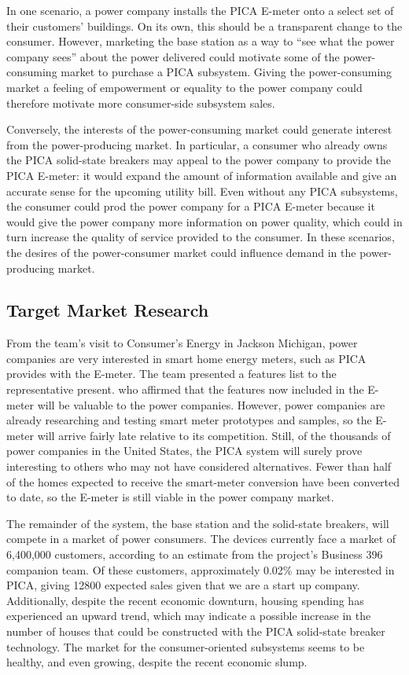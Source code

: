 In one scenario, a power company installs the PICA E-meter onto a select set of their customers' buildings. On its own, this should be a transparent change to the consumer. However, marketing the base station as a way to ``see what the power company sees'' about the power delivered could motivate some of the power-consuming market to purchase a PICA subsystem. Giving the power-consuming market a feeling of empowerment or equality to the power company could therefore motivate more consumer-side subsystem sales.

Conversely, the interests of the power-consuming market could generate interest from the power-producing market. In particular, a consumer who already owns the PICA solid-state breakers may appeal to the power company to provide the PICA E-meter: it would expand the amount of information available and give an accurate sense for the upcoming utility bill. Even without any PICA subsystems, the consumer could prod the power company for a PICA E-meter because it would give the power company more information on power quality, which could in turn increase the quality of service provided to the consumer. In these scenarios, the desires of the power-consumer market could influence demand in the power-producing market.

\subsection{Target Market Research} %
From the team's visit to Consumer's Energy in Jackson Michigan, power companies are very interested in smart home energy meters, such as PICA provides with the E-meter. The team presented a features list to the representative present. who affirmed that the features now included in the E-meter will be valuable to the power companies. However, power companies are already researching and testing smart meter prototypes and samples, so the E-meter will arrive fairly late relative to its competition. Still, of the thousands of power companies in the United States\cite{EIA_Intro}, the PICA system will surely prove interesting to others who may not have considered alternatives. Fewer than half of the homes expected to receive the smart-meter conversion have been converted to date, so the E-meter is still viable in the power company market\cite{Gtech_Smart_Meters}.

The remainder of the system, the base station and the solid-state breakers, will compete in a market of power consumers. The devices currently face a  market of 6,400,000 customers, according to an estimate from the project's Business 396 companion team. Of these customers, approximately 0.02\% may be interested in PICA, giving 12800 expected sales\cite{Gtech_Renew} given that we are a start up company. Additionally, despite the recent economic downturn, housing spending has experienced an upward trend\cite{Economic_Predictions}, which may indicate a possible increase in the number of houses that could be constructed with the PICA solid-state breaker technology. The market for the consumer-oriented subsystems seems to be healthy, and even growing, despite the recent economic slump.

